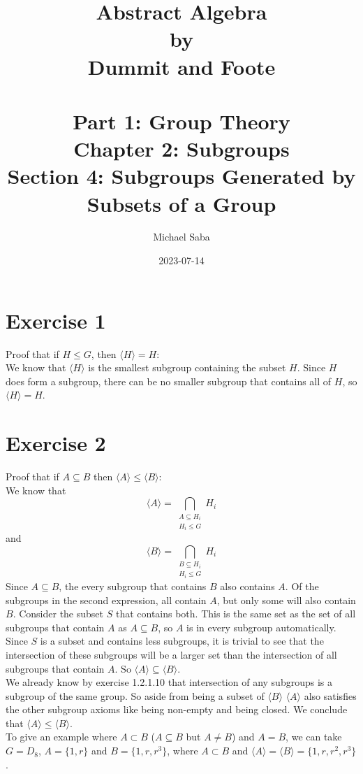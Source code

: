 \documentclass{article}
\title{%
    \Huge Abstract Algebra \\
    \large by \\
    \Large Dummit and Foote \\~\\
    \huge Part 1: Group Theory \\
    \LARGE Chapter 2: Subgroups \\
    \Large Section 4: Subgroups Generated by Subsets of a Group
}
\date{2023-07-14}
\author{Michael Saba}
\newcommand{\seq}{\leqslant}
\newcommand{\sub}{\subseteq}
\newcommand{\prosub}{\subset}
\begin{document}
    \maketitle
    \newpage


    \section*{Exercise 1}
    Proof that if $H \seq G$, then $\langle H \rangle = H$: \\
    We know that $\langle H \rangle$ is the smallest subgroup
    containing the subset $H$.
    Since $H$ does form a subgroup, there can be no smaller
    subgroup that contains all of $H$, so $\langle H \rangle = H$.

    
    \section*{Exercise 2}
    Proof that if $A \sub B$
    then $\langle A \rangle \seq \langle B \rangle$: \\
    We know that
    \[ \langle A \rangle
    = \bigcap_{\substack{A \sub H_i \\ H_i \seq G}} H_i \]
    and
    \[ \langle B \rangle
    = \bigcap_{\substack{B \sub H_i \\ H_i \seq G}} H_i \]
    Since $A \sub B$,
    the every subgroup that contains $B$ also contains $A$.
    Of the subgroups in the second expression,
    all contain $A$, but only some will also contain $B$.
    Consider the subset $S$ that contains both.
    This is the same set as the set of all subgroups that contain
    $A$ as $A \sub B$,
    so $A$ is in every subgroup automatically.
    Since $S$ is a subset and contains less subgroups,
    it is trivial to see that the intersection of these subgroups
    will be a larger set than the intersection of all subgroups
    that contain $A$.
    So $\langle A \rangle \sub \langle B \rangle$. \\
    We already know by exercise 1.2.1.10 that intersection
    of any subgroups is a subgroup of the same group.
    So aside from being a subset of $\langle B \rangle$
    $\langle A \rangle$ also satisfies the other
    subgroup axioms like being non-empty and being closed.
    We conclude that $\langle A \rangle \seq \langle B \rangle$. \\
    To give an example where $A \prosub B$
    ($A \sub B$ but $A \neq B$) and $A = B$,
    we can take $G = D_8$, $A = \{1, r\}$ and $B = \{1, r, r^3\}$,
    where $A \prosub B$
    and $\langle A \rangle = \langle B \rangle = \{1, r, r^2, r^3\}$.
\end{document}
